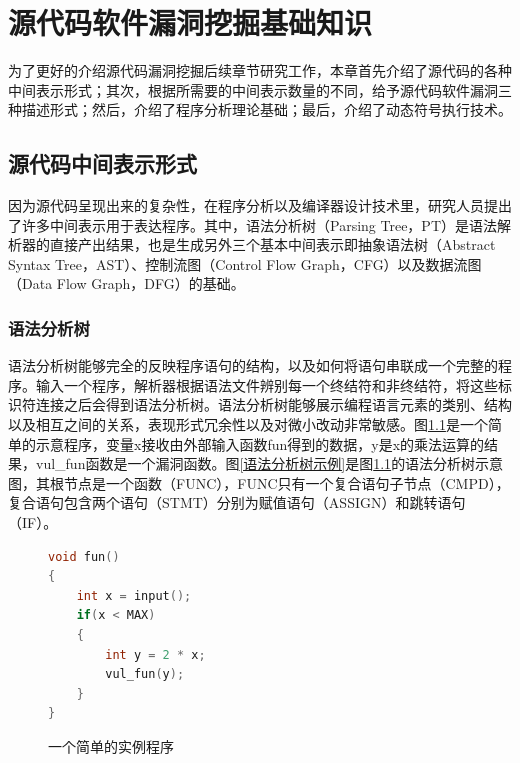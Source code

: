 \chapter{源代码软件漏洞挖掘基础知识}

为了更好的介绍源代码漏洞挖掘后续章节研究工作，本章首先介绍了源代码的各种中间表示形式；其次，根据所需要的中间表示数量的不同，给予源代码软件漏洞三种描述形式；然后，介绍了程序分析理论基础；最后，介绍了动态符号执行技术。

%

\section{源代码中间表示形式}

因为源代码呈现出来的复杂性，在程序分析以及编译器设计技术里，研究人员提出了许多中间表示用于表达程序。其中，语法分析树（Parsing Tree，PT）是语法解析器的直接产出结果，也是生成另外三个基本中间表示即抽象语法树（Abstract Syntax Tree，AST）、控制流图（Control Flow Graph，CFG）以及数据流图（Data Flow Graph，DFG）的基础。

\subsection{语法分析树}

语法分析树能够完全的反映程序语句的结构，以及如何将语句串联成一个完整的程序。输入一个程序，解析器根据语法文件辨别每一个终结符和非终结符，将这些标识符连接之后会得到语法分析树。语法分析树能够展示编程语言元素的类别、结构以及相互之间的关系，表现形式冗余性以及对微小改动非常敏感。图\ref{一个简单的实例程序}是一个简单的示意程序，变量x接收由外部输入函数fun得到的数据，y是x的乘法运算的结果，vul\_fun函数是一个漏洞函数。图\ref{语法分析树示例}是图\ref{一个简单的实例程序}的语法分析树示意图，其根节点是一个函数{（FUNC）}，FUNC只有一个复合语句子节点{（CMPD）}，复合语句包含两个语句{（STMT）}分别为赋值语句{（ASSIGN）}和跳转语句{（IF）}。


\begin{figure}[h]
\begin{lstlisting}[language=C]
void fun()
{
	int x = input();
	if(x < MAX)
	{
		int y = 2 * x;
		vul_fun(y);
	}
}
\end{lstlisting}
\caption{一个简单的实例程序}
\label{一个简单的实例程序}
\end{figure}


